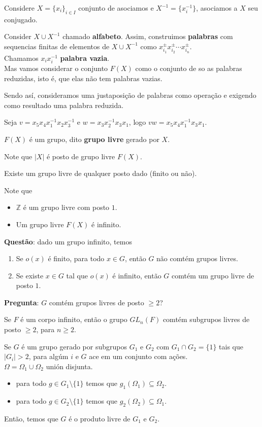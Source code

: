 Considere $X=\{x_i\}_{i\in I}$ conjunto de asociamos e $X^{-1}=\{x_i^{-1}\}$, asociamos a $X$ seu conjugado.\\
\begin{definition}
  Consider $X\cup X^{-1}$ chamado \textbf{alfabeto}. Assim, construimos \textbf{palabras} com sequencias finitas de elementos de $X\cup X^{-1}$ como $x_{i_{1}}^{\pm}x_{i_{2}}^{\pm}\cdots x_{i_{n}}^{\pm}$.\\
  Chamamos $x_ix_i^{-1}$ \textbf{palabra vazia}.\\
  Mas vamos considerar o conjunto $F(X)$ como o conjunto de so as palabras reduzidas, isto é, que elas não tem palabras vazias.
\end{definition}
Sendo así, consideramos uma justaposição de palabras como operação e exigendo como resultado uma palabra reduzida.
\begin{example}
  Seja $v=x_5x_4x_1^{-1}x_2x_3^{-1}$ e $w=x_3x_2^{-1}x_3x_1$, logo $vw=x_5x_4x_1^{-1}x_3x_1$. 
\end{example}
\begin{definition}
  $F(X)$ é um grupo, dito \textbf{grupo livre} gerado por $X$. 
\end{definition}
Note que $|X|$ é posto de grupo livre $F(X)$.
\begin{note}
  Existe um grupo livre de qualquer posto dado (finito ou não).
\end{note}
Note que 
\begin{itemize}
  \item $\mathbb{Z}$ é um grupo livre com posto $1$.
  \item Um grupo livre $F(X)$ é infinito. 
\end{itemize}
\textbf{Questão}: dado um grupo infinito, temos
\begin{enumerate}
  \item Se $o(x)$ é finito, para todo $x\in G$, então $G$ não comtém grupos livres.
  \item Se existe $x\in G$ tal que $o(x)$ é infinito, então $G$ comtém um grupo livre de posto $1$. 
\end{enumerate}
\textbf{Pregunta}: $G$ comtém grupos livres de posto $\geq 2$?
\begin{theorem}
  Se $F$ é um corpo infinito, então o grupo $GL_{n}(F)$ comtém subgrupos livres de posto $\geq 2$, para $n\geq 2$. 
\end{theorem}
\begin{lemma}[Macbeath]
  Se $G$ é um grupo gerado por subgrupos $G_1$ e $G_2$ com $G_1\cap G_2=\{1\}$ tais que $|G_i|> 2$, para algúm $i$ e $G$ ace em um conjunto com ações.\\
  $\Omega=\Omega_1\cup\Omega_2$ unión disjunta.
  \begin{itemize}
    \item para todo $g\in G_1\setminus\{1\}$ temos que $g_1(\Omega_1)\subseteq\Omega_{2}$.
    \item para todo $g\in G_2\setminus\{1\}$ temos que $g_2(\Omega_{2})\subseteq\Omega_1$. 
  \end{itemize}
  Então, temos que $G$ é o produto livre de $G_1$ e $G_2$. 
\end{lemma}
